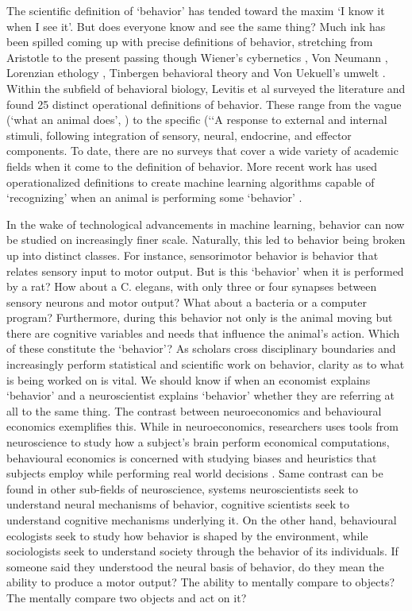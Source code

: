 \documentclass[a4paper, 11pt]{article}
\begin{document}
The scientific definition of `behavior' has tended toward the maxim `I know it when I see it'. But does everyone know and see the same thing? Much ink has been spilled coming up with precise definitions of behavior, stretching from Aristotle \cite{aristotle} to the present passing though Wiener's cybernetics \cite{wiener2019cybernetics}, Von Neumann \cite{von2012computer}, Lorenzian ethology \cite{lorenz2013foundations}, Tinbergen behavioral theory \cite{tinbergen1972animal} and Von Uekuell's umwelt \cite{uexkull1921umwelt}. Within the subfield of behavioral biology, Levitis et al  \cite{levitis2009behavioural} surveyed the literature and found 25 distinct operational definitions of behavior. These range from the vague (`what an animal does', \cite{davis1966integral}) to the specific (`‘A response to external and internal stimuli, following integration of sensory, neural, endocrine, and effector components. To date, there are no surveys that cover a wide variety of academic fields when it come to the definition of behavior.  More recent work has used operationalized definitions to create machine learning algorithms capable of `recognizing' when an animal is performing some `behavior' \cite{berman2014mapping,wiltschko2015mapping,calhoun2019unsupervised}.

In the wake of technological advancements in machine learning, behavior can now be studied on increasingly finer scale. Naturally, this led to behavior being broken up into distinct classes. For instance, sensorimotor behavior is behavior that relates sensory input to motor output. But is this `behavior' when it is performed by a rat? How about a C. elegans, with only three or four synapses between sensory neurons and motor output? What about a bacteria or a computer program? Furthermore, during this behavior not only is the animal moving but there are cognitive variables and needs that influence the animal's action. Which of these constitute the `behavior'? As scholars cross disciplinary boundaries and increasingly perform statistical and scientific work on behavior, clarity as to what is being worked on is vital. We should know if when an economist explains `behavior' and a neuroscientist explains `behavior' whether they are referring at all to the same thing. The contrast between neuroeconomics and behavioural economics exemplifies this. While in neuroeconomics, researchers uses tools from neuroscience to study how a subject's brain perform economical computations, behavioural economics is concerned with studying biases and heuristics that subjects employ while performing real world decisions . Same contrast can be found in other sub-fields of neuroscience, systems neuroscientists seek to understand neural mechanisms of behavior, cognitive scientists seek to understand cognitive mechanisms underlying it. On the other hand, behavioural ecologists seek to study how behavior is shaped by the environment, while sociologists seek to understand society through the behavior of its individuals. If someone said they understood the neural basis of behavior, do they mean the ability to produce a motor output? The ability to mentally compare to objects? The mentally compare two objects and act on it?
\end{document}
